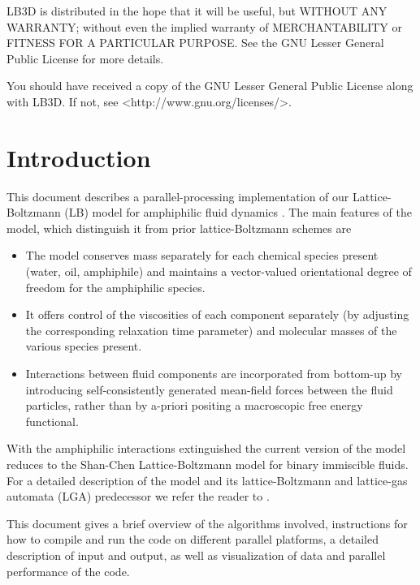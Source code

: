\documentclass[a4paper]{article}
\begin{document}
LB3D is distributed in the hope that it will be useful, but WITHOUT ANY WARRANTY; without even the implied warranty of MERCHANTABILITY or FITNESS FOR A PARTICULAR PURPOSE. See the GNU Lesser General Public License for more details.

You should have received a copy of the GNU Lesser General Public License along with LB3D. If not, see \textless http://www.gnu.org/licenses/\textgreater.
\newpage

\tableofcontents
\newpage

\section{Introduction}
  
This document describes a parallel-processing implementation of our
Lattice-Boltzmann (LB) model for amphiphilic fluid dynamics
\cite{bib:maziar1,bib:maziar2}.  The main features of the model, which
distinguish it from prior lattice-Boltzmann schemes are 

\begin{itemize}
\item 
The model conserves mass separately for each chemical species present (water,
oil, amphiphile) and maintains a vector-valued orientational degree of freedom
for the amphiphilic species. 
\item
It offers  control of the viscosities of each component separately (by
adjusting the corresponding relaxation time parameter) and molecular masses of
the various species present.
\item
Interactions between fluid components are incorporated from bottom-up
by introducing self-consistently generated mean-field
forces between the fluid particles, 
rather than by a-priori positing a macroscopic free energy functional.
\end{itemize}
With the amphiphilic interactions extinguished the current version 
of the model reduces to 
the Shan-Chen Lattice-Boltzmann model \cite{bib:shan-chen} 
for binary immiscible fluids.
For a detailed description of the model and its  lattice-Boltzmann and
lattice-gas automata (LGA) predecessor
we refer the reader to 
\cite{bib:bce,bib:shan-chen,bib:maziar1,bib:maziar2}.

This document gives a brief overview of the algorithms involved,
instructions for how to compile and run the code on different 
parallel platforms, a detailed description of input and output,
as well as visualization of data and parallel performance of the code.
\end{document}
